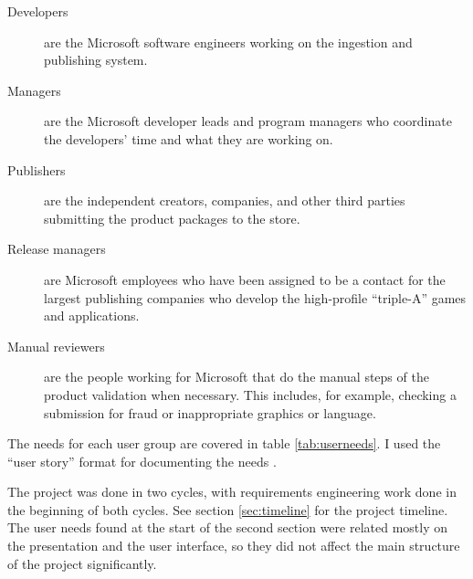 \begin{description}
\item[Developers] are the Microsoft software engineers working on the ingestion and publishing system.
\item[Managers] are the Microsoft developer leads and program managers who coordinate the developers' time and what they are working on.
\item[Publishers] are the independent creators, companies, and other third parties submitting the product packages to the store.
\item[Release managers] are Microsoft employees who have been assigned to be a contact for the largest publishing companies who develop the high-profile ``triple-A'' games and applications. 
\item[Manual reviewers] are the people working for Microsoft that do the manual steps of the product validation when necessary. This includes, for example, checking a submission for fraud or inappropriate graphics or language.
\end{description}

The needs for each user group are covered in table \ref{tab:userneeds}.
I used the ``user story'' format for documenting the needs \cite{cohn2004user}.

The project was done in two cycles, with requirements engineering work done in the beginning of both cycles. See section \ref{sec:timeline} for the project timeline. 
The user needs found at the start of the second section were related mostly on the presentation and the user interface, so they did not affect the main structure of the project significantly.


